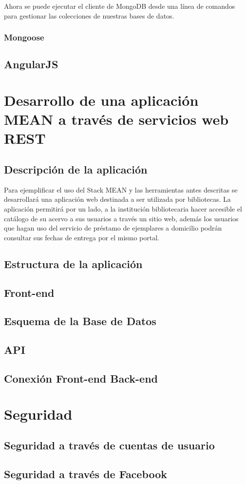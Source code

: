 \documentclass[10pt,a4paper]{report}
\begin{document}
Ahora se puede ejecutar el cliente de MongoDB desde una línea de comandos para gestionar las colecciones de nuestras bases de datos.





\subsection{Mongoose}

\section{AngularJS}

\chapter{Desarrollo de una aplicación MEAN a través de servicios web REST}

\section{Descripción de la aplicación}
Para ejemplificar el uso del Stack MEAN y las herramientas antes descritas se desarrollará una aplicación web destinada a ser utilizada por bibliotecas. La aplicación permitirá por un lado, a la institución bibliotecaria hacer accesible el catálogo de su acervo a sus usuarios a través un sitio web, además los usuarios que hagan uso del servicio de préstamo de ejemplares a domicilio podrán consultar sus fechas de entrega por el mismo portal. 

\section{Estructura de la aplicación}
\section{Front-end}
\section{Esquema de la Base de Datos}
\section{API}
\section{Conexión Front-end Back-end}

\chapter{Seguridad}
\section{Seguridad a través de cuentas de usuario}
\section{Seguridad a través de Facebook}



\end{document}
